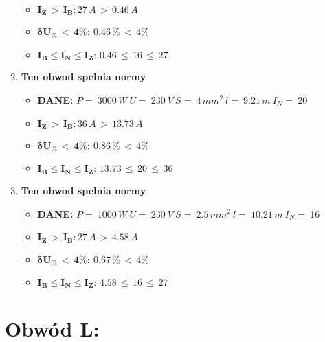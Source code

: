 \begin{enumerate}
\begin{itemize}
\item[\textcolor{Green}{\cmark}] $ \pmb{I_Z \, >  \, I_B: }27 \, A \, > \,0.46 \, A $
\item[\textcolor{Green}{\cmark}] $ \pmb{ \delta U_\% \, < \, 4\%:} \:0.46 \, \% \,< \, 4\% $
\item[\textcolor{Green}{\cmark}] $ \pmb{I_B \le I_N \le I_Z: } \, 0.46 \, \le \,16 \, \le \,27 $
\end{itemize}
\item \textcolor{Green}{\cmark} \textbf{Ten obwod spelnia normy} 
\begin{itemize}
\item[] \textbf{DANE: } \: $ P = \:3000\, W\: U = \:230\: V\: S = \:4\, mm^2\: l = \:9.21\, m\: I_N= \: $20
\item[\textcolor{Green}{\cmark}] $ \pmb{I_Z \, >  \, I_B: }36 \, A \, > \,13.73 \, A $
\item[\textcolor{Green}{\cmark}] $ \pmb{ \delta U_\% \, < \, 4\%:} \:0.86 \, \% \,< \, 4\% $
\item[\textcolor{Green}{\cmark}] $ \pmb{I_B \le I_N \le I_Z: } \, 13.73 \, \le \,20 \, \le \,36 $
\end{itemize}
\item \textcolor{Green}{\cmark} \textbf{Ten obwod spelnia normy} 
\begin{itemize}
\item[] \textbf{DANE: } \: $ P = \:1000\, W\: U = \:230\: V\: S = \:2.5\, mm^2\: l = \:10.21\, m\: I_N= \: $16
\item[\textcolor{Green}{\cmark}] $ \pmb{I_Z \, >  \, I_B: }27 \, A \, > \,4.58 \, A $
\item[\textcolor{Green}{\cmark}] $ \pmb{ \delta U_\% \, < \, 4\%:} \:0.67 \, \% \,< \, 4\% $
\item[\textcolor{Green}{\cmark}] $ \pmb{I_B \le I_N \le I_Z: } \, 4.58 \, \le \,16 \, \le \,27 $
\end{itemize}
\end{enumerate}
\section{Obwód L:}

